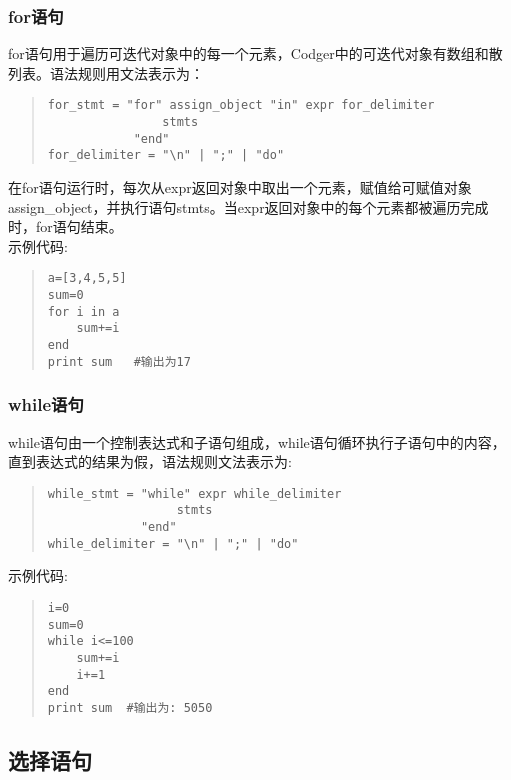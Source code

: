 \subsubsection{for语句}
for语句用于遍历可迭代对象中的每一个元素，Codger中的可迭代对象有数组和散列表。语法规则用文法表示为：
\begin{quote}
\begin{verbatim}
for_stmt = "for" assign_object "in" expr for_delimiter
                stmts
            "end"
for_delimiter = "\n" | ";" | "do"
\end{verbatim}
\end{quote}
在for语句运行时，每次从expr返回对象中取出一个元素，赋值给可赋值对象 assign\_object，并执行语句stmts。当expr返回对象中的每个元素都被遍历完成时，for语句结束。\\
示例代码:
\begin{quote}
\begin{verbatim}
a=[3,4,5,5]
sum=0
for i in a
    sum+=i
end
print sum   #输出为17
\end{verbatim}
\end{quote}

\subsubsection{while语句}
while语句由一个控制表达式和子语句组成，while语句循环执行子语句中的内容，直到表达式的结果为假，语法规则文法表示为:
\begin{quote}
\begin{verbatim}
while_stmt = "while" expr while_delimiter
                  stmts
             "end"
while_delimiter = "\n" | ";" | "do"
\end{verbatim}
\end{quote}
示例代码:
\begin{quote}
\begin{verbatim}
i=0
sum=0
while i<=100
    sum+=i
    i+=1
end 
print sum  #输出为: 5050
\end{verbatim}
\end{quote}

\subsection{选择语句}
